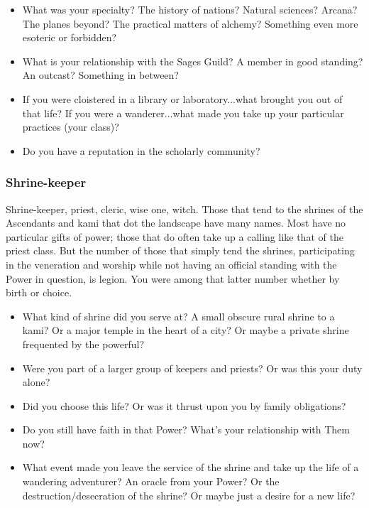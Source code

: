 \begin{itemize}
	\item What was your specialty? The history of nations? Natural sciences? Arcana? The planes beyond? The practical matters of alchemy? Something even more esoteric or forbidden?
	\item What is your relationship with the Sages Guild? A member in good standing? An outcast? Something in between?
	\item If you were cloistered in a library or laboratory...what brought you out of that life? If you were a wanderer...what made you take up your particular practices (your class)?
	\item Do you have a reputation in the scholarly community?
\end{itemize}

\subsubsection{Shrine-keeper}

Shrine-keeper, priest, cleric, wise one, witch. Those that tend to the shrines of the Ascendants and kami that dot the landscape have many names. Most have no particular gifts of power; those that do often take up a calling like that of the priest class. But the number of those that simply tend the shrines, participating in the veneration and worship while not having an official standing with the Power in question, is legion. You were among that latter number whether by birth or choice.

\begin{itemize}
	\item What kind of shrine did you serve at? A small obscure rural shrine to a kami? Or a major temple in the heart of a city? Or maybe a private shrine frequented by the powerful?
	\item Were you part of a larger group of keepers and priests? Or was this your duty alone?
	\item Did you choose this life? Or was it thrust upon you by family obligations?
	\item Do you still have faith in that Power? What's your relationship with Them now?
	\item What event made you leave the service of the shrine and take up the life of a wandering adventurer? An oracle from your Power? Or the destruction/desecration of the shrine? Or maybe just a desire for a new life?
\end{itemize}

